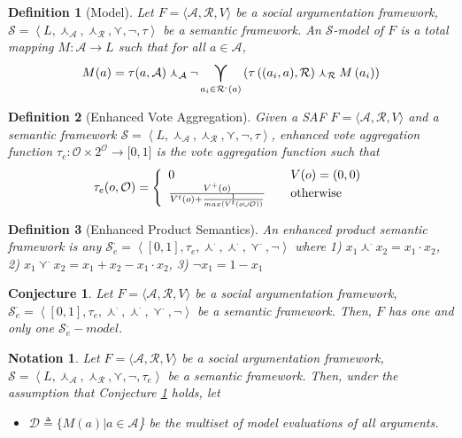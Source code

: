 \documentclass{article}
\newtheorem{definition}{Definition}
\newtheorem{conjecture}{Conjecture}
\newtheorem{notation}{Notation}
\newcommand{\args}{\mathcal{A}} %
\newcommand{\att}{\mathcal{R}}  %
\newcommand{\valueset}{L}
\newcommand{\obj}{\mathcal{O}} %
\newcommand{\attackers}[1]{\att^\text{-}\left(#1\right)}
\newcommand{\safid}{F}               %
\newcommand{\saf}{\safid = \safbody} %
\newcommand{\safbody}{\langle \args, \att, V \rangle} %
\newcommand{\semid}{\mathcal{S}}        %
\newcommand{\sembodyNew}{\left\langle \valueset,\SAFand_\mathcal{A}, \SAFand_\mathcal{R},\SAFor,\lnot,\tau \right\rangle} %
\newcommand{\sembodyNewE}{\left\langle \valueset,\SAFand_\mathcal{A}, \SAFand_\mathcal{R},\SAFor,\lnot,\tau_{e} \right\rangle} %
\newcommand{\SAFand}{\curlywedge}     %
\newcommand{\SAFor}{\curlyvee}        %
\DeclareMathOperator*{\SAFOr}{\bigcurlyvee} %
\newcommand{\sem}{\mathcal{S}}
\newcommand{\dataset}{\mathcal{D}}   %
\begin{document}
\begin{definition}[Model] 
\label{def:model}
  Let $\saf$ be a social argumentation framework, $\sem = \sembodyNew$ be a semantic framework. An $\semid$-model of $\safid$ is a total mapping $M : \args \rightarrow \valueset$ such that for all $a \in \args$,
  $$\displaystyle M(a) = \tau(a, \args ) \SAFand_\args \lnot \SAFOr_{a_i \in \attackers{a}} \left(\tau\left((a_i, a), \att \right) \SAFand_\att M\left(a_i\right)\right)$$
\end{definition}

\begin{definition}[Enhanced Vote Aggregation]
\label{def:enhVoteAgg}
Given a SAF $\saf$ and a semantic framework $\sem = \sembodyNew$, enhanced vote aggregation function
$\tau_{e}:\obj  \times {2}^{\obj} \rightarrow\lbrack0,1]$ is the vote aggregation function such that
\[
\tau_{e}  (o, \mathcal{O})  = \left\{
\begin{array}
[c]{lll}
0 &  & V(o) = (0,0)\\
\frac{V^{+}(o)}{V^{t}(o)+\frac{1}{max(V^{t}(o \cup \mathcal{O}))}} &  & \text{otherwise}%
\end{array}
\right.
\]
\end{definition}

\begin{definition}
[Enhanced Product Semantics]An enhanced product semantic framework is any
$\mathcal{S}_{e}^{\cdot}=\left\langle [0,1],\tau_{e
},\curlywedge^{\cdot}, \curlywedge^{\cdot}, \curlyvee^{\cdot},\lnot\right\rangle $ where 1) $x_{1}\curlywedge^{\cdot}
x_{2}=x_{1}\cdot x_{2}$, 2) $x_{1}\curlyvee^{\cdot} x_{2}=x_{1}+x_{2}-x_{1}\cdot
x_{2}$, 3) $\lnot x_{1}=1-x_{1}$
\end{definition}

\begin{conjecture}
\label{conj:1model}
Let $\saf$ be a social argumentation framework, $\mathcal{S}_{e}^{\cdot}=\left\langle [0,1],\tau_{e
},\curlywedge^{\cdot}, \curlywedge^{\cdot}, \curlyvee^{\cdot},\lnot\right\rangle$ be a semantic framework. Then, $\safid$ has one and only one $\semid_{e}^{.}-model.$

\end{conjecture}

\begin{notation}
Let $\saf$ be a social argumentation framework, $\sem = \sembodyNewE$ be a semantic framework. Then, under the assumption that Conjecture \ref{conj:1model} holds, let 
\begin{itemize}
\item $\dataset \triangleq \{M(a)|a \in \args$\} be the multiset of model evaluations of all arguments.
\end{itemize}
\end{notation}
\end{document}
